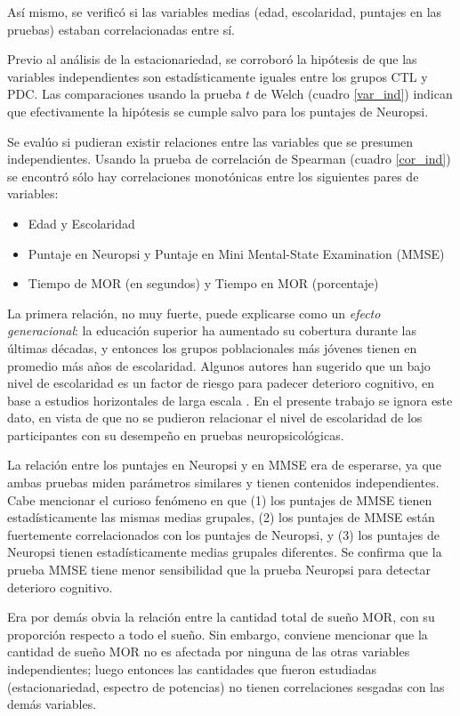 Así mismo, se verificó si las variables medias (edad, escolaridad, puntajes en las pruebas) estaban correlacionadas entre sí.

Previo al análisis de la estacionariedad, se corroboró la hipótesis de que las variables 
independientes son estadísticamente iguales entre los grupos CTL y PDC. Las comparaciones
usando la prueba $t$ de Welch (cuadro \ref{var_ind}) indican que efectivamente la hipótesis se cumple salvo
para los puntajes de Neuropsi.

Se evalúo si pudieran existir relaciones entre las variables que se presumen independientes.
Usando la prueba de correlación de Spearman (cuadro \ref{cor_ind}) se encontró sólo hay 
correlaciones monotónicas entre los siguientes pares de variables:
\begin{itemize}
\item Edad y Escolaridad
\item Puntaje en Neuropsi y Puntaje en Mini Mental-State Examination (MMSE)
\item Tiempo de MOR (en segundos) y Tiempo en MOR (porcentaje)
\end{itemize}

La primera relación, no muy fuerte, puede explicarse como un \textit{efecto generacional}: la educación 
superior ha aumentado su cobertura durante las últimas décadas, y entonces los grupos poblacionales 
más jóvenes tienen en promedio más años de escolaridad. 
%
Algunos autores han sugerido que un bajo nivel de escolaridad es un factor de riesgo para padecer
deterioro cognitivo, en base a estudios horizontales de larga escala \cite{Mejia_Arango2007}.
%
En el presente trabajo se ignora este dato, en vista de que no se pudieron relacionar el nivel de 
escolaridad de los participantes con su desempeño en pruebas neuropsicológicas.

La relación entre los puntajes en Neuropsi y en MMSE era de esperarse, ya que ambas pruebas miden
parámetros similares y tienen contenidos independientes. Cabe mencionar el curioso fenómeno en que (1) 
los puntajes de MMSE
tienen estadísticamente las mismas medias grupales, (2) los puntajes de MMSE están 
fuertemente correlacionados con los puntajes de Neuropsi, y (3) los puntajes de Neuropsi
tienen estadísticamente medias grupales diferentes. Se confirma que la prueba MMSE
tiene menor sensibilidad que la prueba Neuropsi para detectar deterioro cognitivo.

Era por demás obvia la relación entre la cantidad total de sueño MOR, con su proporción respecto a 
todo el sueño. Sin embargo, conviene mencionar que la cantidad de sueño MOR no es afectada por
ninguna de las otras variables independientes; luego entonces las cantidades que fueron estudiadas
(estacionariedad, espectro de potencias) no tienen correlaciones sesgadas con las demás variables.

